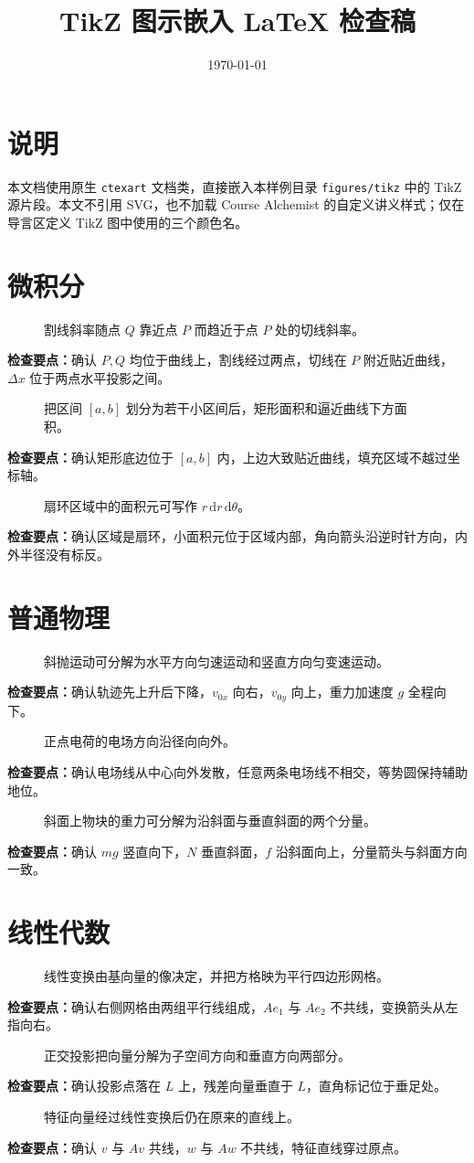 \documentclass[UTF8,zihao=-4,fontset=fandol]{ctexart}
\title{TikZ 图示嵌入 LaTeX 检查稿}
\author{}
\date{\today}
\newcommand{\FigureSourceRoot}{../figures/tikz}
\newcommand{\TikzValidationFigure}[3]{%
  \begin{figure}[htbp]
    \centering
    
    \caption{#2}
    \label{fig:#1}
  \end{figure}
  \noindent\textbf{检查要点：}#3\par
}
\begin{document}
\maketitle
\tableofcontents

\section{说明}

本文档使用原生 \verb|ctexart| 文档类，直接嵌入本样例目录 \verb|figures/tikz| 中的 TikZ 源片段。本文不引用 SVG，也不加载 Course Alchemist 的自定义讲义样式；仅在导言区定义 TikZ 图中使用的三个颜色名。

\section{微积分}

\TikzValidationFigure
  {calc-01-derivative-tangent}
  {割线斜率随点 $Q$ 靠近点 $P$ 而趋近于点 $P$ 处的切线斜率。}
  {确认 $P,Q$ 均位于曲线上，割线经过两点，切线在 $P$ 附近贴近曲线，$\Delta x$ 位于两点水平投影之间。}

\TikzValidationFigure
  {calc-02-riemann-area}
  {把区间 $[a,b]$ 划分为若干小区间后，矩形面积和逼近曲线下方面积。}
  {确认矩形底边位于 $[a,b]$ 内，上边大致贴近曲线，填充区域不越过坐标轴。}

\TikzValidationFigure
  {calc-03-polar-sector}
  {扇环区域中的面积元可写作 $r\,\mathrm{d}r\,\mathrm{d}\theta$。}
  {确认区域是扇环，小面积元位于区域内部，角向箭头沿逆时针方向，内外半径没有标反。}

\section{普通物理}

\TikzValidationFigure
  {phys-01-projectile-motion}
  {斜抛运动可分解为水平方向匀速运动和竖直方向匀变速运动。}
  {确认轨迹先上升后下降，$v_{0x}$ 向右，$v_{0y}$ 向上，重力加速度 $g$ 全程向下。}

\TikzValidationFigure
  {phys-02-point-charge-field}
  {正点电荷的电场方向沿径向向外。}
  {确认电场线从中心向外发散，任意两条电场线不相交，等势圆保持辅助地位。}

\TikzValidationFigure
  {phys-03-inclined-plane-forces}
  {斜面上物块的重力可分解为沿斜面与垂直斜面的两个分量。}
  {确认 $mg$ 竖直向下，$N$ 垂直斜面，$f$ 沿斜面向上，分量箭头与斜面方向一致。}

\section{线性代数}

\TikzValidationFigure
  {linalg-01-linear-transform-grid}
  {线性变换由基向量的像决定，并把方格映为平行四边形网格。}
  {确认右侧网格由两组平行线组成，$Ae_1$ 与 $Ae_2$ 不共线，变换箭头从左指向右。}

\TikzValidationFigure
  {linalg-02-projection-subspace}
  {正交投影把向量分解为子空间方向和垂直方向两部分。}
  {确认投影点落在 $L$ 上，残差向量垂直于 $L$，直角标记位于垂足处。}

\TikzValidationFigure
  {linalg-03-eigenvector-action}
  {特征向量经过线性变换后仍在原来的直线上。}
  {确认 $v$ 与 $Av$ 共线，$w$ 与 $Aw$ 不共线，特征直线穿过原点。}
\end{document}
